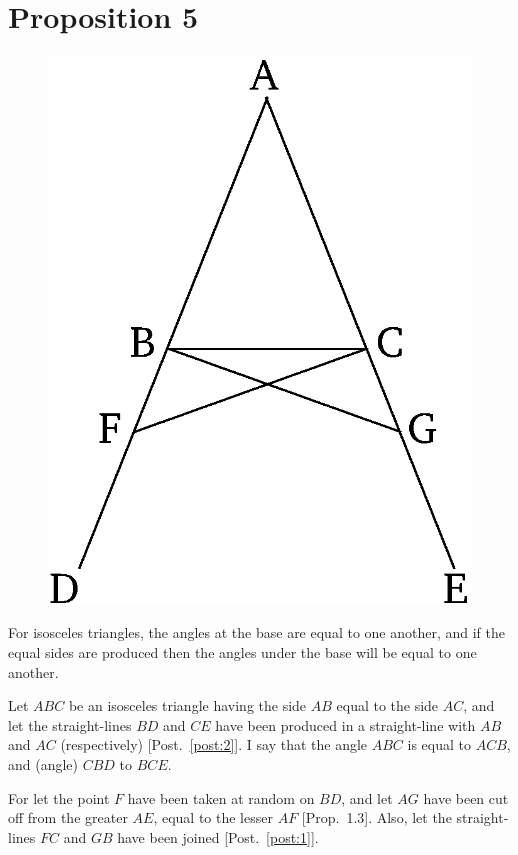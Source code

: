 \chapter*{Proposition 5}
\label{prop:5}

\begin{figure}[ht]
    \begin{center}
    \includegraphics[width=0.5\linewidth]{figures/fig05e.eps}
    \label{fig:prop_5}
    \end{center}
\end{figure}

For isosceles triangles, the angles at the base are equal to one another, and if
the equal sides are produced then the angles under the base will be equal to one another.

Let $ABC$ be an isosceles triangle having the side $AB$ equal to the side $AC$, and let the straight-lines $BD$ and $CE$ have been produced in a straight-line
with $AB$ and $AC$ (respectively) [Post.~\ref{post:2}]. I say that the angle $ABC$ is equal to $ACB$, and (angle) $CBD$  to $BCE$.

For let the point $F$ have been taken at random on  $BD$, and let $AG$
have been cut off from the greater $AE$, equal to the lesser $AF$ [Prop.~1.3]. Also, let
the straight-lines $FC$ and $GB$ have been joined [Post.~\ref{post:1}].

